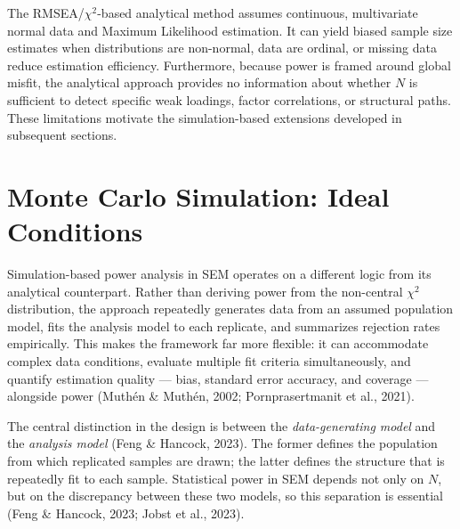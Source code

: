 \documentclass[
  letterpaper,
  DIV=11,
  numbers=noendperiod]{scrartcl}
\begin{document}
\begin{tcolorbox}[enhanced jigsaw, arc=.35mm, bottomrule=.15mm, bottomtitle=1mm, breakable, colback=white, colbacktitle=quarto-callout-important-color!10!white, colframe=quarto-callout-important-color-frame, coltitle=black, left=2mm, leftrule=.75mm, opacityback=0, opacitybacktitle=0.6, rightrule=.15mm, title=\textcolor{quarto-callout-important-color}{\faExclamation}\hspace{0.5em}{Limitations of the Analytical Approach}, titlerule=0mm, toprule=.15mm, toptitle=1mm]

The RMSEA/\(\chi^2\)-based analytical method assumes continuous,
multivariate normal data and Maximum Likelihood estimation. It can yield
biased sample size estimates when distributions are non-normal, data are
ordinal, or missing data reduce estimation efficiency. Furthermore,
because power is framed around global misfit, the analytical approach
provides no information about whether \(N\) is sufficient to detect
specific weak loadings, factor correlations, or structural paths. These
limitations motivate the simulation-based extensions developed in
subsequent sections.

\end{tcolorbox}

\section{Monte Carlo Simulation: Ideal Conditions}\label{sec-sim-ideal}

Simulation-based power analysis in SEM operates on a different logic
from its analytical counterpart. Rather than deriving power from the
non-central \(\chi^2\) distribution, the approach repeatedly generates
data from an assumed population model, fits the analysis model to each
replicate, and summarizes rejection rates empirically. This makes the
framework far more flexible: it can accommodate complex data conditions,
evaluate multiple fit criteria simultaneously, and quantify estimation
quality --- bias, standard error accuracy, and coverage --- alongside
power (Muthén \& Muthén, 2002; Pornprasertmanit et al., 2021).

The central distinction in the design is between the
\emph{data-generating model} and the \emph{analysis model} (Feng \&
Hancock, 2023). The former defines the population from which replicated
samples are drawn; the latter defines the structure that is repeatedly
fit to each sample. Statistical power in SEM depends not only on \(N\),
but on the discrepancy between these two models, so this separation is
essential (Feng \& Hancock, 2023; Jobst et al., 2023).
\end{document}
